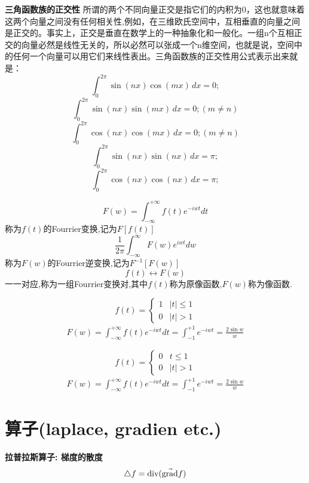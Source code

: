 \documentclass{book}
\begin{document}
\textbf{三角函数族的正交性}
所谓的两个不同向量正交是指它们的内积为0，这也就意味着这两个向量之间没有任何相关性,例如，在三维欧氏空间中，互相垂直的向量之间是正交的。事实上，正交是垂直在数学上的一种抽象化和一般化。一组n个互相正交的向量必然是线性无关的，所以必然可以张成一个n维空间，也就是说，空间中的任何一个向量可以用它们来线性表出。三角函数族的正交性用公式表示出来就是：
$$\int _{0}^{2\pi}\sin (nx)\cos (mx) \,dx=0;$$
$$\int _{0}^{2\pi}\sin (nx)\sin (mx) \,dx=0;(m\ne n)$$
$$\int _{0}^{2\pi}\cos (nx)\cos (mx) \,dx=0;(m\ne n)$$
$$\int _{0}^{2\pi}\sin (nx)\sin (nx) \,dx=\pi;$$
$$\int _{0}^{2\pi}\cos (nx)\cos (nx) \,dx=\pi;$$
\bigskip

$$F(w)=\int_{-\infty}^{+\infty}f(t)e^{-iwt}dt$$
称为$f(t)$的Fourrier变换,记为$F[f(t)]$
$$\frac{ 1}{2\pi}\int_{-\infty}^{\infty}F(w)e^{iwt}dw$$称为$F(w)$的Fourrier逆变换,记为$F^{-1}[F(w)]$
$$f(t) \longleftrightarrow F(w)$$一一对应,称为一组Fourrier变换对,其中$f(t)$称为原像函数,$F(w)$称为像函数.
\begin{example}
\begin{equation}
f(t)=
\left\{
		\begin{array}{ll}
			1 & |t| \leq 1 \\
			0 & |t| > 1
		\end{array}
		\right.
\end{equation}
\begin{eqnarray}
 F(w)=\int_{-\infty}^{+\infty} f(t)e^{-iwt}dt=\int_{-1}^{+1}e^{-iwt}=\frac{2\sin w}{w}
\end{eqnarray}
\end{example}

\begin{example}
\begin{equation}
f(t)=
\left\{
		\begin{array}{ll}
			0 & t \leq 1 \\
			0 & |t| > 1
		\end{array}
		\right.
\end{equation}
\begin{eqnarray}
 F(w)=\int_{-\infty}^{+\infty} f(t)e^{-iwt}dt=\int_{-1}^{+1}e^{-iwt}=\frac{2\sin w}{w}
\end{eqnarray}
\end{example}

\section{算子(laplace, gradien etc.)}
\textbf{拉普拉斯算子: 梯度的散度}
$$\mathop{}\!\mathbin\bigtriangleup f = \mbox{div} (\vec{\mbox{grad}}f)$$
\end{document}
